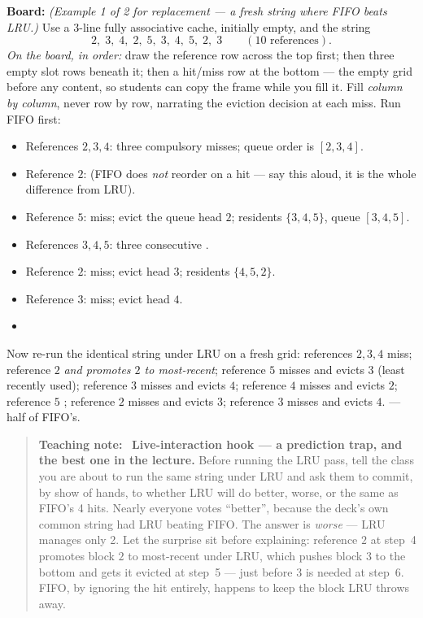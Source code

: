 \documentclass[11pt]{article}
\newenvironment{teachingaside}{\begin{quote}\small\color{primary-gold}\textbf{Teaching note:}\ }{\end{quote}}
\begin{document}
\textbf{Board:} \textit{(Example 1 of 2 for replacement --- a fresh string where FIFO beats LRU.)} Use a $3$-line fully associative cache, initially empty, and the string
\[ 2,\;3,\;4,\;2,\;5,\;3,\;4,\;5,\;2,\;3 \qquad (10\text{ references}). \]
\emph{On the board, in order:} draw the reference row across the top first; then three empty slot rows beneath it; then a hit/miss row at the bottom --- the empty grid before any content, so students can copy the frame while you fill it. Fill \emph{column by column}, never row by row, narrating the eviction decision at each miss. Run FIFO first:
\begin{itemize}
  \item References $2, 3, 4$: three compulsory misses; queue order is $[2,3,4]$.
  \item Reference $2$:  (FIFO does \emph{not} reorder on a hit --- say this aloud, it is the whole difference from LRU).
  \item Reference $5$: miss; evict the queue head $2$; residents $\{3,4,5\}$, queue $[3,4,5]$.
  \item References $3, 4, 5$: three consecutive .
  \item Reference $2$: miss; evict head $3$; residents $\{4,5,2\}$.
  \item Reference $3$: miss; evict head $4$.
  \item {}
\end{itemize}
Now re-run the identical string under LRU on a fresh grid: references $2,3,4$ miss; reference $2$  \emph{and promotes $2$ to most-recent}; reference $5$ misses and evicts $3$ (least recently used); reference $3$ misses and evicts $4$; reference $4$ misses and evicts $2$; reference $5$ ; reference $2$ misses and evicts $3$; reference $3$ misses and evicts $4$.  --- half of FIFO's.

\begin{teachingaside}
\textbf{Live-interaction hook --- a prediction trap, and the best one in the lecture.} Before running the LRU pass, tell the class you are about to run the same string under LRU and ask them to commit, by show of hands, to whether LRU will do better, worse, or the same as FIFO's 4 hits. Nearly everyone votes ``better'', because the deck's own common string had LRU beating FIFO. The answer is \emph{worse} --- LRU manages only 2. Let the surprise sit before explaining: reference $2$ at step~4 promotes block $2$ to most-recent under LRU, which pushes block $3$ to the bottom and gets it evicted at step~5 --- just before $3$ is needed at step~6. FIFO, by ignoring the hit entirely, happens to keep the block LRU throws away. 
\end{teachingaside}
\end{document}
